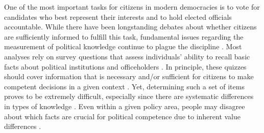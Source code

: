 

One of the most important tasks for citizens in modern democracies is to vote for candidates who best represent their interests and to hold elected officials accountable. While there have been longstanding debates about whether citizens are sufficiently informed to fulfill this task, fundamental issues regarding the measurement of political knowledge continue to plague the discipline \citep{mondak2001developing,sturgis2008experiment,pietryka2013analysis}. Most analyses rely on survey questions that assess individuals' ability to recall basic facts about political institutions and officeholders \citep[e.g.,][]{zaller1990political,carpini1996americans}. %
In principle, these quizzes should cover information that is necessary and/or sufficient for citizens to make competent decisions in a given context \citep{lupia2006elitism}. Yet, determining such a set of items proves to be extremely difficult, especially since there are systematic differences in types of knowledge \citep{barabas2014question}. Even within a given policy area, people may disagree about which facts are crucial for political competence due to inherent value differences \citep{lupia2015uninformed}. 

